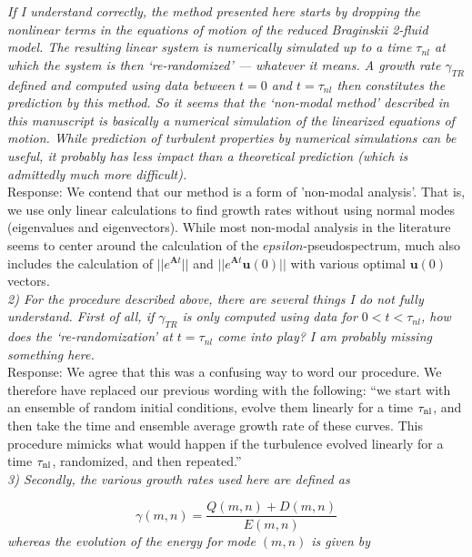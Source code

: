 \documentclass[12pt]{article}
\def\beq{\begin{equation}}
\def\eeq{\end{equation}}
\begin{document}
\emph{If I understand correctly, the method presented here starts by dropping the nonlinear terms in
the equations of motion of the reduced Braginskii 2-fluid model. The resulting linear system is
numerically simulated up to a time $\tau_{nl}$ at which the system is then ‘re-randomized’ — whatever
it means. A growth rate $\gamma_{TR}$ defined and computed using data between $t = 0$ and $t = \tau_{nl}$ then
constitutes the prediction by this method. So it seems that the ‘non-modal method’ described in
this manuscript is basically a numerical simulation of the linearized equations of motion. While
prediction of turbulent properties by numerical simulations can be useful, it probably has less
impact than a theoretical prediction (which is admittedly much more difficult).} \\

Response: We contend that our method is a form of 'non-modal analysis'. That is, we use only linear calculations to find growth rates without using normal modes (eigenvalues and eigenvectors). While most non-modal analysis in the literature seems to center around the calculation of the $epsilon$-pseudospectrum, much also includes the calculation of $||e^{\mathbf{A} t}||$ and $||e^{\mathbf{A} t} \mathbf{u}(0)||$ with various optimal $\mathbf{u}(0)$ vectors. \\




\emph{2) For the procedure described above, there are several things I do not fully understand. First of
all, if $\gamma_{TR}$ is only computed using data for $0 < t < \tau_{nl}$, how does the ‘re-randomization’ at $t = \tau_{nl}$
come into play? I am probably missing something here.} \\


Response: We agree that this was a confusing way to word our procedure. We therefore have replaced our previous wording with the following: ``we start with an ensemble of random initial conditions, evolve them linearly for a time $\tau_{\rm{nl}}$, and then take the time and ensemble average growth rate of these curves. 
This procedure mimicks what would happen if the turbulence evolved linearly for a time $\tau_{\rm{nl}}$, randomized, and then repeated.''
\\


\emph{3) Secondly, the various growth rates used here are defined as}

\beq
\gamma(m,n) = \frac{Q(m,n) + D(m,n)}{E(m,n)} \nonumber
\eeq
\emph{whereas the evolution of the energy for mode $(m, n)$ is given by}
\end{document}
